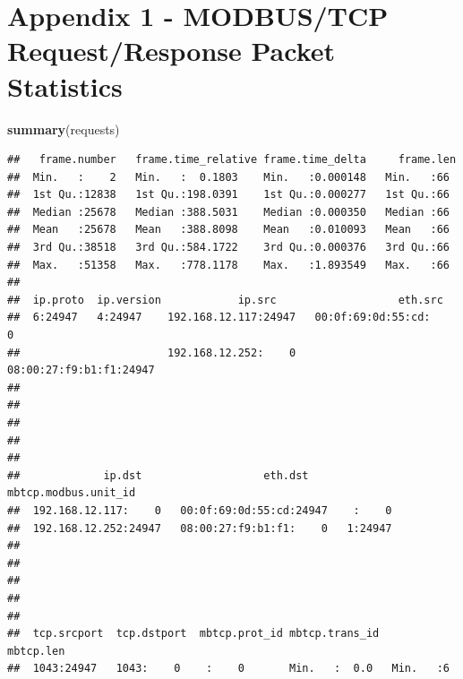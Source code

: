\documentclass[]{article}
\newenvironment{Shaded}{\begin{snugshade}}{\end{snugshade}}
\newcommand{\KeywordTok}[1]{\textcolor[rgb]{0.13,0.29,0.53}{\textbf{{#1}}}}
\newcommand{\NormalTok}[1]{{#1}}
\begin{document}
\pagebreak

\section{Appendix 1 - MODBUS/TCP Request/Response Packet
Statistics}\label{appendix-1---modbustcp-requestresponse-packet-statistics}

\begin{Shaded}
\begin{Highlighting}[]
\KeywordTok{summary}\NormalTok{(requests)}
\end{Highlighting}
\end{Shaded}

\begin{verbatim}
##   frame.number   frame.time_relative frame.time_delta     frame.len 
##  Min.   :    2   Min.   :  0.1803    Min.   :0.000148   Min.   :66  
##  1st Qu.:12838   1st Qu.:198.0391    1st Qu.:0.000277   1st Qu.:66  
##  Median :25678   Median :388.5031    Median :0.000350   Median :66  
##  Mean   :25678   Mean   :388.8098    Mean   :0.010093   Mean   :66  
##  3rd Qu.:38518   3rd Qu.:584.1722    3rd Qu.:0.000376   3rd Qu.:66  
##  Max.   :51358   Max.   :778.1178    Max.   :1.893549   Max.   :66  
##                                                                     
##  ip.proto  ip.version            ip.src                   eth.src     
##  6:24947   4:24947    192.168.12.117:24947   00:0f:69:0d:55:cd:    0  
##                       192.168.12.252:    0   08:00:27:f9:b1:f1:24947  
##                                                                       
##                                                                       
##                                                                       
##                                                                       
##                                                                       
##             ip.dst                   eth.dst      mbtcp.modbus.unit_id
##  192.168.12.117:    0   00:0f:69:0d:55:cd:24947    :    0             
##  192.168.12.252:24947   08:00:27:f9:b1:f1:    0   1:24947             
##                                                                       
##                                                                       
##                                                                       
##                                                                       
##                                                                       
##  tcp.srcport  tcp.dstport  mbtcp.prot_id mbtcp.trans_id    mbtcp.len
##  1043:24947   1043:    0    :    0       Min.   :  0.0   Min.   :6  

\end{verbatim}
\end{document}
